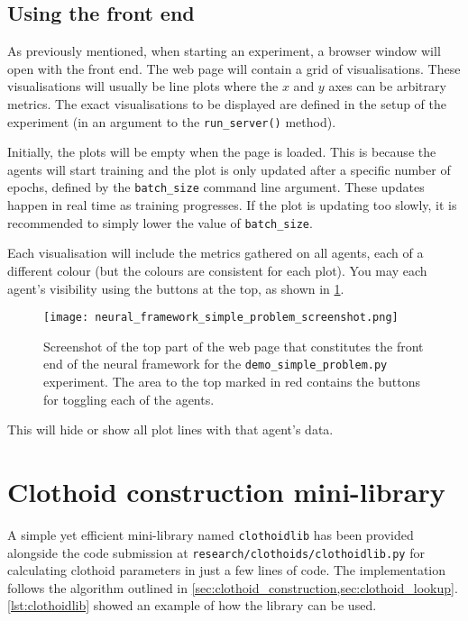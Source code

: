 \section{Using the front end}
\label{sec:using_front_end}
As previously mentioned, when starting an experiment, a browser window will open with the front end.
The web page will contain a grid of visualisations. 
These visualisations will usually be line plots where the $x$ and $y$ axes can be arbitrary metrics.
The exact visualisations to be displayed are defined in the setup of the experiment (in an argument to the \texttt{run\_server()} method).

Initially, the plots will be empty when the page is loaded. 
This is because the agents will start training and the plot is only updated after a specific number of epochs, defined by the \texttt{batch\_size} command line argument.
These updates happen in real time as training progresses.
If the plot is updating too slowly, it is recommended to simply lower the value of \texttt{batch\_size}.

Each visualisation will include the metrics gathered on all agents, each of a different colour (but the colours are consistent for each plot).
You may each agent's visibility using the buttons at the top, as shown in \ref{fig:framework_front_end_screenshot}.
\begin{figure}
    \centering
    \texttt{[image: neural\_framework\_simple\_problem\_screenshot.png]}
    \caption{Screenshot of the top part of the web page that constitutes the front end of the neural framework for the \texttt{demo\_simple\_problem.py} experiment. The area to the top marked in red contains the buttons for toggling each of the agents.}
    \label{fig:framework_front_end_screenshot}
\end{figure}
This will hide or show all plot lines with that agent's data.

\chapter{Clothoid construction mini-library}
\label{app:clothoidlib}
A simple yet efficient mini-library named \texttt{clothoidlib} has been provided alongside the code submission at \texttt{research/clothoids/clothoidlib.py} for calculating clothoid parameters in just a few lines of code.
The implementation follows the algorithm outlined in \ref{sec:clothoid_construction,sec:clothoid_lookup}.
\ref{lst:clothoidlib} showed an example of how the library can be used. 

